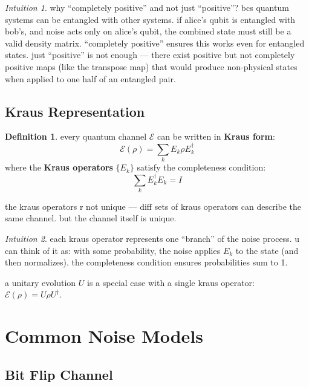 \documentclass[11pt,a4paper]{article}
\theoremstyle{definition}
\newtheorem{definition}{Definition}[section]
\theoremstyle{remark}
\newtheorem*{intuition}{Intuition}
\begin{document}
\begin{intuition}
why ``completely positive'' and not just ``positive''? bcs quantum systems can be entangled with other systems. if alice's qubit is entangled with bob's, and noise acts only on alice's qubit, the combined state must still be a valid density matrix. ``completely positive'' ensures this works even for entangled states. just ``positive'' is not enough --- there exist positive but not completely positive maps (like the transpose map) that would produce non-physical states when applied to one half of an entangled pair.
\end{intuition}

\subsection{Kraus Representation}

\begin{definition}
every quantum channel $\mathcal{E}$ can be written in \textbf{Kraus form}:
\[
\boxed{\mathcal{E}(\rho) = \sum_k E_k \rho E_k^\dagger}
\]
where the \textbf{Kraus operators} $\{E_k\}$ satisfy the completeness condition:
\[
\sum_k E_k^\dagger E_k = I
\]
\end{definition}

the kraus operators r not unique --- diff sets of kraus operators can describe the same channel. but the channel itself is unique.

\begin{intuition}
each kraus operator represents one ``branch'' of the noise process. u can think of it as: with some probability, the noise applies $E_k$ to the state (and then normalizes). the completeness condition ensures probabilities sum to 1.

a unitary evolution $U$ is a special case with a single kraus operator: $\mathcal{E}(\rho) = U\rho U^\dagger$.
\end{intuition}

\section{Common Noise Models}

\subsection{Bit Flip Channel}
\end{document}
